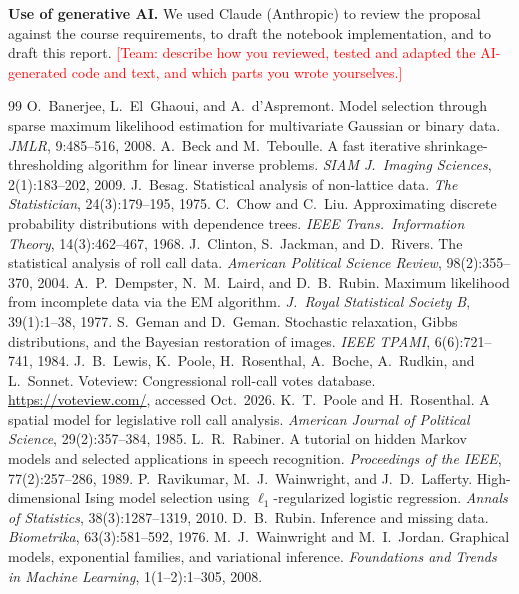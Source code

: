 \documentclass[10pt]{article}
\newcommand{\todo}[1]{\textcolor{red}{[#1]}}
\begin{document}
\textbf{Use of generative AI.} We used Claude (Anthropic) to review the proposal against the course requirements,
to draft the notebook implementation, and to draft this report. \todo{Team: describe how you reviewed, tested and
adapted the AI-generated code and text, and which parts you wrote yourselves.}

\label{endmain}
\begin{thebibliography}{99}\small
\setlength{\itemsep}{1pt}
 O.~Banerjee, L.~El~Ghaoui, and A.~d'Aspremont. Model selection through sparse maximum
likelihood estimation for multivariate Gaussian or binary data. \emph{JMLR}, 9:485--516, 2008.
 A.~Beck and M.~Teboulle. A fast iterative shrinkage-thresholding algorithm for linear inverse
problems. \emph{SIAM J.\ Imaging Sciences}, 2(1):183--202, 2009.
 J.~Besag. Statistical analysis of non-lattice data. \emph{The Statistician}, 24(3):179--195, 1975.
 C.~Chow and C.~Liu. Approximating discrete probability distributions with dependence trees.
\emph{IEEE Trans.\ Information Theory}, 14(3):462--467, 1968.
 J.~Clinton, S.~Jackman, and D.~Rivers. The statistical analysis of roll call data.
\emph{American Political Science Review}, 98(2):355--370, 2004.
 A.~P.~Dempster, N.~M.~Laird, and D.~B.~Rubin. Maximum likelihood from incomplete data via the
EM algorithm. \emph{J.\ Royal Statistical Society B}, 39(1):1--38, 1977.
 S.~Geman and D.~Geman. Stochastic relaxation, Gibbs distributions, and the Bayesian restoration of
images. \emph{IEEE TPAMI}, 6(6):721--741, 1984.
 J.~B.~Lewis, K.~Poole, H.~Rosenthal, A.~Boche, A.~Rudkin, and L.~Sonnet. Voteview: Congressional
roll-call votes database. \url{https://voteview.com/}, accessed Oct.\ 2026.
 K.~T.~Poole and H.~Rosenthal. A spatial model for legislative roll call analysis.
\emph{American Journal of Political Science}, 29(2):357--384, 1985.
 L.~R.~Rabiner. A tutorial on hidden Markov models and selected applications in speech
recognition. \emph{Proceedings of the IEEE}, 77(2):257--286, 1989.
 P.~Ravikumar, M.~J.~Wainwright, and J.~D.~Lafferty. High-dimensional Ising model selection
using $\ell_1$-regularized logistic regression. \emph{Annals of Statistics}, 38(3):1287--1319, 2010.
 D.~B.~Rubin. Inference and missing data. \emph{Biometrika}, 63(3):581--592, 1976.
 M.~J.~Wainwright and M.~I.~Jordan. Graphical models, exponential families, and variational
inference. \emph{Foundations and Trends in Machine Learning}, 1(1--2):1--305, 2008.
\end{thebibliography}
\end{document}
